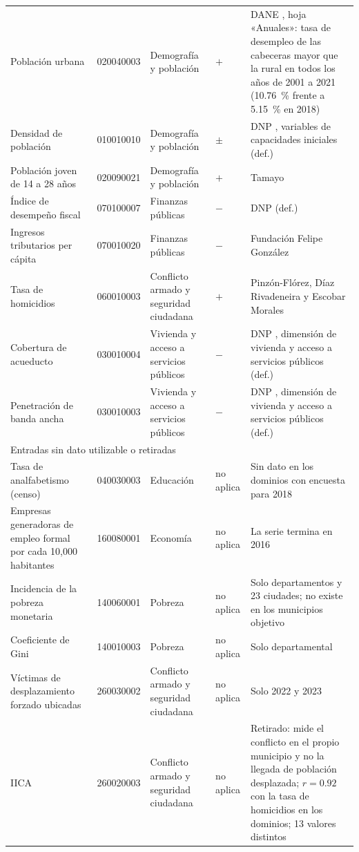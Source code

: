 {\begin{longtable}{p{2.8cm} p{1.5cm} p{2.0cm} p{0.8cm} p{4.6cm}}
Población urbana & 020040003 & Demografía y población & $+$ & DANE \cite{DANE_Anexo_CNPV2018}, hoja «Anuales»: tasa de desempleo de las cabeceras mayor que la rural en todos los años de 2001 a 2021 (10.76~\% frente a 5.15~\% en 2018) \\
Densidad de población & 010010010 & Demografía y población & $\pm$ & DNP \cite{DNP_EIG01_2020}, variables de capacidades iniciales (def.) \\
Población joven de 14 a 28 años & 020090021 & Demografía y población & $+$ & Tamayo \cite{Tamayo2008} \\
Índice de desempeño fiscal & 070100007 & Finanzas públicas & $-$ & DNP \cite{DNP_IDF2024} (def.) \\
Ingresos tributarios per cápita & 070010020 & Finanzas públicas & $-$ & Fundación Felipe González \cite{FFG2021} \\
Tasa de homicidios & 060010003 & Conflicto armado y seguridad ciudadana & $+$ & Pinzón-Flórez, Díaz Rivadeneira y Escobar Morales \cite{PinzonFlorez2025} \\
Cobertura de acueducto & 030010004 & Vivienda y acceso a servicios públicos & $-$ & DNP \cite{DNP_Cartilla2019}, dimensión de vivienda y acceso a servicios públicos (def.) \\
Penetración de banda ancha & 030010003 & Vivienda y acceso a servicios públicos & $-$ & DNP \cite{DNP_Cartilla2019}, dimensión de vivienda y acceso a servicios públicos (def.) \\
\midrule
\multicolumn{5}{l}{Entradas sin dato utilizable o retiradas} \\
Tasa de analfabetismo (censo) & 040030003 & Educación & no aplica & Sin dato en los dominios con encuesta para 2018 \\
Empresas generadoras de empleo formal por cada 10,000 habitantes & 160080001 & Economía & no aplica & La serie termina en 2016 \\
Incidencia de la pobreza monetaria & 140060001 & Pobreza & no aplica & Solo departamentos y 23 ciudades; no existe en los municipios objetivo \\
Coeficiente de Gini & 140010003 & Pobreza & no aplica & Solo departamental \\
Víctimas de desplazamiento forzado ubicadas & 260030002 & Conflicto armado y seguridad ciudadana & no aplica & Solo 2022 y 2023 \\
IICA & 260020003 & Conflicto armado y seguridad ciudadana & no aplica & Retirado: mide el conflicto en el propio municipio y no la llegada de población desplazada; $r = 0.92$ con la tasa de homicidios en los dominios; 13 valores distintos \\
\end{longtable}
}
\label{app:auditoria}

